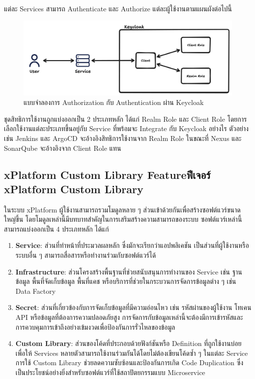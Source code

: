 แต่ละ Services สามารถ Authenticate และ Authorize แต่ละผู้ใช้งานตามแผนผังต่อไปนี้
\begin{figure}[H]
    \begin{center}
        \includegraphics[scale=0.19]{resources/authorization-diagram.png}
    \end{center}
    \caption[แบบจำลองการ Authorization กับ Authentication ผ่าน Keycloak]{แบบจำลองการ Authorization กับ Authentication ผ่าน Keycloak}
    \label{fig:authorization-diagram}
\end{figure}
ชุดสิทธิการใช้งานถูกแบ่งออกเป็น 2 ประเภทหลัก ได้แก่ Realm Role และ Client Role โดยการเลือกใช้งานแต่ละประเภทขึ้นอยู่กับ Service ที่พร้อมจะ Integrate กับ Keycloak อย่างไร ตัวอย่างเช่น Jenkins และ ArgoCD จะอ้างอิงสิทธิการใช้งานจาก Realm Role ในขณะที่ Nexus และ SonarQube จะอ้างอิงจาก Client Role แทน

\subsection{\ifenglish xPlatform Custom Library Feature\else ฟีเจอร์ xPlatform Custom Library \fi}
ในระบบ xPlatform ผู้ใช้งานสามารถรวมโมดูลหลาย ๆ ส่วนเข้าด้วยกันเพื่อสร้างซอฟต์แวร์ขนาดใหญ่ขึ้น โดยโมดูลเหล่านี้มีบทบาทสำคัญในการเสริมสร้างความสามารถของระบบ ซอฟต์แวร์เหล่านี้สามารถแบ่งออกเป็น 4 ประเภทหลัก ได้แก่
\begin{enumerate} 
    \item \textbf{Service}: ส่วนที่ทำหน้าที่ประมวลผลหลัก ซึ่งมักจะเรียกว่าแอปพลิเคชัน  เป็นส่วนที่ผู้ใช้งานหรือระบบอื่น ๆ สามารถสื่อสารหรือทำงานร่วมกับซอฟต์แวร์ได้
    \item \textbf{Infrastructure}: ส่วนโครงสร้างพื้นฐานที่ช่วยสนับสนุนการทำงานของ Service เช่น ฐานข้อมูล พื้นที่จัดเก็บข้อมูล พื้นที่แคช หรือบริการที่ช่วยในกระบวนการจัดการข้อมูลต่าง ๆ เช่น Data Factory
    \item \textbf{Secret}: ส่วนที่เกี่ยวข้องกับการจัดเก็บข้อมูลที่มีความอ่อนไหว เช่น รหัสผ่านของผู้ใช้งาน โทเคน API หรือข้อมูลที่ต้องการความปลอดภัยสูง การจัดการกับข้อมูลเหล่านี้จะต้องมีการเข้ารหัสและการควบคุมการเข้าถึงอย่างเข้มงวดเพื่อป้องกันการรั่วไหลของข้อมูล 
    \item \textbf{Custom Library}: ส่วนของโค้ดที่ประกอบด้วยฟังก์ชันหรือ Definition ที่ถูกใช้งานบ่อย เพื่อให้ Services หลายตัวสามารถใช้งานร่วมกันได้โดยไม่ต้องเขียนโค้ดซ้ำ ๆ ในแต่ละ Service การใช้ Custom Library ช่วยลดความซับซ้อนและป้องกันการเกิด Code Duplication ซึ่งเป็นประโยชน์อย่างยิ่งสำหรับซอฟต์แวร์ที่ใช้สถาปัตยกรรมแบบ Microservice 
\end{enumerate}

